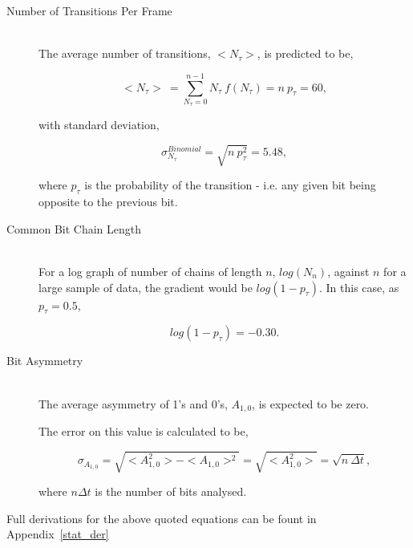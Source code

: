 			\begin{description}
				\item[Number of Transitions Per Frame] \hfill \\
					
					The average number of transitions, $<N_\tau>$, is predicted to be,

					\begin{equation}
						<N_\tau> \ = \sum_{N_{\tau}=0}^{n-1} N_{\tau}\ f(N_{\tau}) = n\ p_{\tau} = 60,
						\label{eqn:tansition_expectation}
					\end{equation}

					with standard deviation,

					\begin{equation}
						\sigma_{N_\tau}^{Binomial} = \sqrt{ n\ p_{\tau}^2} = 5.48,
					\end{equation}

					where $p_\tau$ is the probability of the transition - i.e. any given bit being opposite to the previous bit.

				\item[Common Bit Chain Length] \hfill \\

					For a log graph of number of chains of length $n$, $log(N_n)$, against $n$ for a large sample of data, the gradient would be $log(1 - p_\tau)$.
					In this case, as $p_\tau = 0.5$, 

					\begin{equation}
						log(1 - p_\tau) = -0.30.
						\label{eqn:log_chain_length_gradient}			
					\end{equation}

				\item[Bit Asymmetry] \hfill \\

					The average asymmetry of 1's and 0's, $A_{1,0}$, is expected to be zero.

					The error on this value is calculated to be,

					\begin{equation}
						\sigma_{A_{1,0}} = \sqrt{<A_{1,0}^2> - <A_{1,0}>^2} = \sqrt{<A_{1,0}^2>} = \sqrt{n\ \Delta t},
					\end{equation}

					where $n \Delta t$ is the number of bits analysed. 

			\end{description}	

			Full derivations for the above quoted equations can be fount in Appendix~\ref{stat_der}

